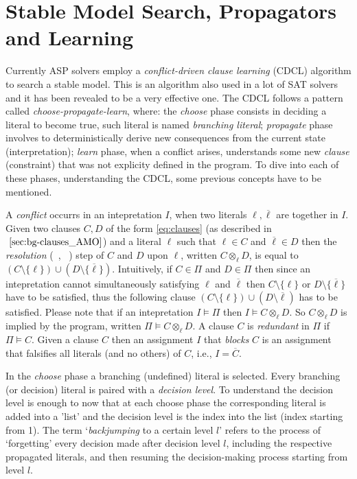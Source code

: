 \section{Stable Model Search, Propagators and Learning}
\label{sec:bg-SM}

Currently ASP solvers employ a \textit{conflict-driven clause learning} (CDCL) algorithm
\cite{DBLP:journals/ai/GebserKS12} to search a stable model.
This is an algorithm also used in a lot of SAT solvers and it has been revealed to be a 
very effective one.
The CDCL follows a pattern called \textit{choose-propagate-learn}, where: 
the \textit{choose} phase consists in deciding a literal to become true, such literal 
is named \textit{branching literal};
\textit{propagate} phase involves to deterministically derive new consequences from the current
state (interpretation); \textit{learn} phase, when a conflict arises, understands
some new \textit{clause} (constraint) that was not explicity defined in the program.
To dive into each of these phases, understanding the CDCL, some previous concepts have
to be mentioned.

A \textit{conflict} occurrs in an intepretation $I$,
when two literals $\ell, \overline{\ell}$ are together in $I$.
Given two clauses $C,D$ of the form \eqref{eq:clauses} (as described in $~\ref{sec:bg-clauses_AMO}$) and a literal 
$\ell$ such that $\ell \in C$ and $\overline{\ell} \in D$ then the \textit{resolution}
(~\cite{davis1960computing}, ~\cite{robinson1965machine})
step of $C$ and $D$ upon $\ell$, written $C \otimes_{\ell} D$, is equal to 
$(C \setminus \{\ell\}) \cup (D \setminus \{\overline{\ell}\})$.
Intuitively, if $C \in \Pi$ and $D \in \Pi$ 
then since an intepretation cannot simultaneously
satisfying $\ell$ and $\overline{\ell}$ then $C \setminus \{\ell\}$ or 
$D \setminus \{ \overline{\ell}\}$ have to be satisfied, thus the following clause 
$(C \setminus \{\ell\}) \cup (D \setminus \overline{\ell})$ has to be satisfied.
Please note that if an intepretation $I \models \Pi$ then $I \models C \otimes_{\ell} D$.
So $C \otimes_{\ell} D$ is implied by the program,
written $\Pi \models C \otimes_{\ell} D$.
A clause $C$ is \textit{redundant} in $\Pi$ if $\Pi \models C$.
Given a clause $C$ then an assignment $I$ that \textit{blocks}
$C$ is an assignment that falsifies all literals (and no others)
of $C$, i.e., $I = \overline{C}$. 

In the \textit{choose} phase a branching (undefined) literal is selected.
Every branching (or decision) literal is paired with a \textit{decision level}.
To understand the decision level is enough to 
now that at each choose phase the corresponding literal is added into a 'list' and
the decision level is the index into the list (index starting from 1). 
The term `\textit{backjumping} to a certain level $l$' refers to the process of `forgetting' 
every decision made after decision level $l$, 
including the respective propagated literals, and then 
resuming the decision-making process starting from level $l$.


